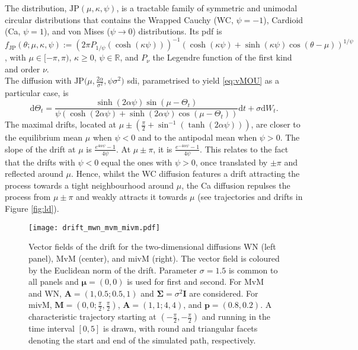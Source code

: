 \documentclass[oneside,11pt]{article}
\newcommand{\R}{\mathbb{R}}
\newcommand{\rd}{\mathrm{d}}
\newcommand{\bmu}{\boldsymbol\mu}
\newcommand{\bp}{\mathbf{p}}
\newcommand{\bSigma}{\boldsymbol\Sigma}
\newcommand{\bA}{\mathbf{A}}
\newcommand{\bI}{\mathbf{I}}
\newcommand{\bM}{\mathbf{M}}
\newcommand{\lrp}[1]{\left(#1\right)}
\begin{document}
The \cite{Jones2005} distribution, $\mathrm{JP}(\mu,\kappa,\psi)$, is a tractable family of symmetric and unimodal circular distributions that contains the Wrapped Cauchy (WC, $\psi=-1$), Cardioid (Ca, $\psi=1$), and von Mises ($\psi\to0$) distributions. Its pdf is
$f_{\mathrm{JP}}(\theta;\mu,\kappa,\psi):=(2\pi \allowbreak P_{1/\psi}(\cosh(\kappa\psi)))^{-1}(\cosh(\kappa\psi)\allowbreak+\allowbreak\sinh(\kappa\psi)\allowbreak\cos(\theta-\mu))^{1/\psi}$, with $\mu\in[-\pi,\pi)$, $\kappa\geq0$, $\psi\in\R$, and $P_\nu$ the Legendre function of the first kind and order $\nu$. \\

The diffusion with $\mathrm{JP}\big(\mu,\frac{2\alpha}{\sigma^2},\psi\sigma^2\big)$ sdi, parametrised to yield \eqref{eq:vMOU} as a particular case, is
\[
\rd \Theta_t=\frac{\sinh(2\alpha\psi)\sin(\mu-\Theta_t)}{\psi(\cosh(2\alpha\psi)+\sinh(2\alpha\psi)\cos(\mu-\Theta_t))}
\rd t+\sigma\rd W_t.
\]
The maximal drifts, located at $\mu\pm(\frac{\pi}{2}+\allowbreak\sin^{-1}(\tanh(2\alpha\psi)))$, are closer to the equilibrium mean $\mu$ when $\psi<0$ and to the antipodal mean when $\psi>0$. The slope of the drift at $\mu$ is
$\frac{e^{4\alpha\psi}-1}{4\psi}$. At $\mu\pm\pi$, it is $\frac{e^{-4\alpha\psi}-1}{4\psi}$. This relates to the fact that the drifts with $\psi<0$ equal the ones with $\psi>0$, once translated by $\pm\pi$ and reflected around $\mu$. Hence, whilst the WC diffusion features a drift attracting the process towards a tight neighbourhood around $\mu$, the Ca diffusion repulses the process from $\mu\pm\pi$ and weakly attracts it towards $\mu$ (see trajectories and drifts in Figure \ref{fig:ld}).

\begin{figure}[H]
\centering
\texttt{[image: drift\_mwn\_mvm\_mivm.pdf]}
\caption{\small Vector fields of the drift for the two-dimensional diffusions WN (left panel), MvM (center), and mivM (right). The vector field is coloured by the Euclidean norm of the drift. Parameter $\sigma=1.5$ is common to all panels and $\bmu=(0,0)$ is used for first and second. For MvM and WN, $\bA=\lrp{1,0.5;0.5,1}$ and $\bSigma=\sigma^2\bI$ are considered. For mivM, $\bM=\lrp{0,0;\frac{\pi}{2},\frac{\pi}{2}}$, $\bA=\lrp{1,1;4,4}$, and $\bp=(0.8,0.2)$. A characteristic trajectory starting at $(-\frac{\pi}{2},-\frac{\pi}{2})$ and running in the time interval $[0,5]$ is drawn, with round and triangular facets denoting the start and end of the simulated path, respectively. \label{fig:vecdf}}
\end{figure}
\end{document}
